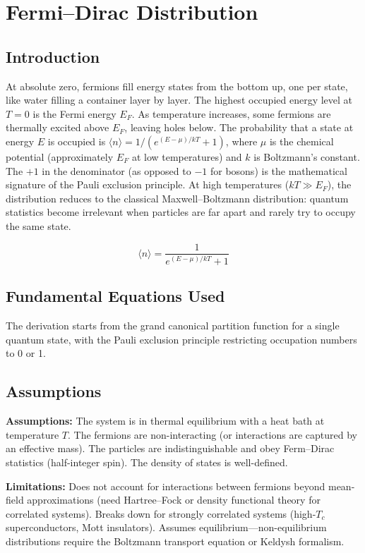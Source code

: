 \chapter{Fermi--Dirac Distribution}

\section*{Introduction}

At absolute zero, fermions fill energy states from the bottom up, one per state, like water filling a container layer by layer. The highest occupied energy level at $T = 0$ is the Fermi energy $E_F$. As temperature increases, some fermions are thermally excited above $E_F$, leaving holes below. The probability that a state at energy $E$ is occupied is $\langle n \rangle = 1/(e^{(E-\mu)/kT} + 1)$, where $\mu$ is the chemical potential (approximately $E_F$ at low temperatures) and $k$ is Boltzmann's constant. The $+1$ in the denominator (as opposed to $-1$ for bosons) is the mathematical signature of the Pauli exclusion principle. At high temperatures ($kT \gg E_F$), the distribution reduces to the classical Maxwell--Boltzmann distribution: quantum statistics become irrelevant when particles are far apart and rarely try to occupy the same state.


\[
\langle n \rangle = \frac{1}{e^{(E-\mu)/kT}+1}
\]

\section*{Fundamental Equations Used}

The derivation starts from the grand canonical partition function for a single quantum state, with the Pauli exclusion principle restricting occupation numbers to 0 or 1.

\section*{Assumptions}

\textbf{Assumptions:} The system is in thermal equilibrium with a heat bath at temperature $T$. The fermions are non-interacting (or interactions are captured by an effective mass). The particles are indistinguishable and obey Ferm--Dirac statistics (half-integer spin). The density of states is well-defined.


\textbf{Limitations:} Does not account for interactions between fermions beyond mean-field approximations (need Hartree--Fock or density functional theory for correlated systems). Breaks down for strongly correlated systems (high-$T_c$ superconductors, Mott insulators). Assumes equilibrium---non-equilibrium distributions require the Boltzmann transport equation or Keldysh formalism.


